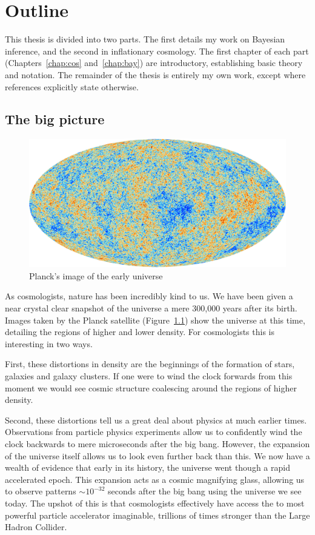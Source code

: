 \chapter{Outline}
\label{chap:out}

This thesis is divided into two parts. The first details my work on Bayesian inference, and the second in inflationary cosmology.
The first chapter of each part (Chapters~\ref{chap:cos} and~\ref{chap:bay}) are introductory, establishing basic theory and notation. The remainder of the thesis is entirely my own work, except where references explicitly state otherwise.

\section{The big picture}
\begin{figure}
  \includegraphics[width=\textwidth]{chapter_outline/figures/planck}
  \caption{Planck's image of the early universe}\label{fig:out:planck}
\end{figure}

As cosmologists, nature has been incredibly kind to us. We have been given a near crystal clear snapshot of the universe a mere 300,000 years after its birth. Images taken by the Planck satellite (Figure~\ref{fig:out:planck}) show the universe at this time, detailing the regions of higher and lower density. For cosmologists this is interesting in two ways. 

First, these distortions in density are the beginnings of the formation of stars, galaxies and galaxy clusters. If one were to wind the clock forwards from this moment we would see cosmic structure coalescing around the regions of higher density.

Second, these distortions tell us a great deal about physics at much earlier times. Observations from particle physics experiments allow us to confidently wind the clock backwards to mere microseconds after the big bang.
However, the expansion of the universe itself allows us to look even further back than this. We now have a wealth of evidence that early in its history, the universe went though a rapid accelerated epoch.  This expansion acts as a cosmic magnifying glass, allowing us to observe patterns $\sim10^{-32}$ seconds after the big bang using the universe we see today. The upshot of this is that cosmologists effectively have access the to most powerful particle accelerator imaginable, trillions of times stronger than the Large Hadron Collider. 

